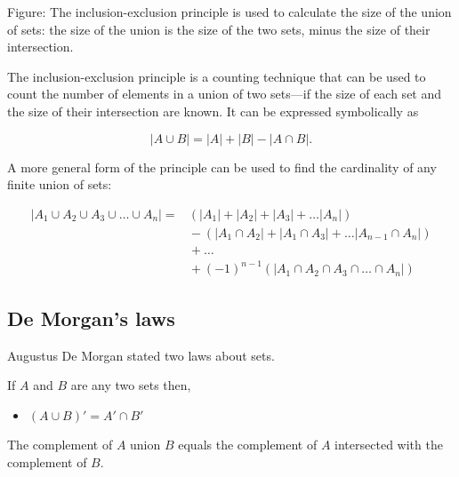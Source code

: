 Figure: The inclusion-exclusion principle is used to calculate the size of the union of
sets: the size of the union is the size of the two sets, minus the size of their
intersection.



The inclusion-exclusion principle is a counting technique that can be used to count the
number of elements in a union of two sets—if the size of each set and the size of their
intersection are known. It can be expressed symbolically as



$$|A \cup B| = |A| + |B| - |A \cap B|.$$



A more general form of the principle can be used to find the cardinality of any finite
union of sets:



\begin{align} \left|A _{1}\cup A _{2}\cup A _{3}\cup\ldots\cup A _{n}\right| =& \left(\left|A _{1}\right|+\left|A _{2}\right|+\left|A _{3}\right|+\ldots\left|A _{n}\right|\right) \\ &{} - \left(\left|A _{1}\cap A _{2}\right|+\left|A _{1}\cap A _{3}\right|+\ldots\left|A _{n-1}\cap A _{n}\right|\right) \\ &{} + \ldots \\ &{} + \left(-1\right)^{n-1}\left(\left|A _{1}\cap A _{2}\cap A _{3}\cap\ldots\cap A _{n}\right|\right) \end{align}




\subsection{De Morgan's laws}
\label{sss:demo-5292}




Augustus De Morgan stated two laws about sets.



If $A$ and $B$ are any two sets then,





\begin{itemize}
    \item $ (A \cup B)' = A' \cap B'$
\end{itemize}

The complement of $A$ union $B$ equals the complement of $A$ intersected with the complement of $B$.




